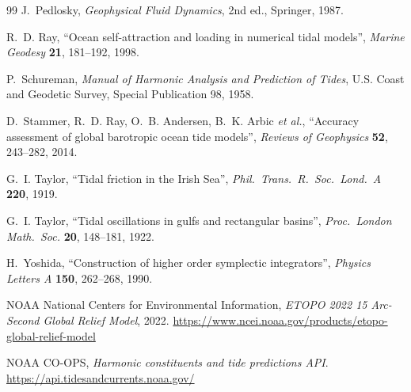 \documentclass[11pt,a4paper,oneside]{report}
\theoremstyle{definition}
\theoremstyle{plain}
\theoremstyle{remark}
\begin{document}
\begin{thebibliography}{99}
 J.~Pedlosky,
\emph{Geophysical Fluid Dynamics}, 2nd ed., Springer, 1987.

 R.~D. Ray,
``Ocean self-attraction and loading in numerical tidal models'',
\emph{Marine Geodesy} \textbf{21}, 181--192, 1998.

 P.~Schureman,
\emph{Manual of Harmonic Analysis and Prediction of Tides},
U.S. Coast and Geodetic Survey, Special Publication 98, 1958.

 D.~Stammer, R.~D. Ray, O.~B. Andersen, B.~K. Arbic
\emph{et al.},
``Accuracy assessment of global barotropic ocean tide models'',
\emph{Reviews of Geophysics} \textbf{52}, 243--282, 2014.

 G.~I. Taylor,
``Tidal friction in the Irish Sea'',
\emph{Phil.\ Trans.\ R.\ Soc.\ Lond.\ A} \textbf{220}, 1919.

 G.~I. Taylor,
``Tidal oscillations in gulfs and rectangular basins'',
\emph{Proc.\ London Math.\ Soc.} \textbf{20}, 148--181, 1922.

 H.~Yoshida,
``Construction of higher order symplectic integrators'',
\emph{Physics Letters A} \textbf{150}, 262--268, 1990.

 NOAA National Centers for Environmental Information,
\emph{ETOPO 2022 15 Arc-Second Global Relief Model}, 2022.
\url{https://www.ncei.noaa.gov/products/etopo-global-relief-model}

 NOAA CO-OPS,
\emph{Harmonic constituents and tide predictions API}.
\url{https://api.tidesandcurrents.noaa.gov/}

\end{thebibliography}
\end{document}
